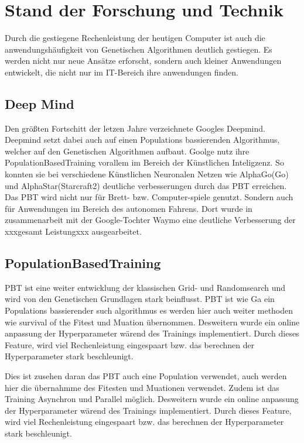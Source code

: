 \section{Stand der Forschung und Technik}
Durch die gestiegene Rechenleistung der heutigen Computer ist auch die anwendungshäufigkeit von Genetischen Algorithmen deutlich gestiegen. Es werden nicht nur neue Ansätze erforscht, sondern auch kleiner Anwendungen entwickelt, die nicht nur im IT-Bereich ihre anwendungen finden.

\subsection{Deep Mind}
Den größten Fortschitt der letzen Jahre verzeichnete Googles Deepmind. Deepmind setzt dabei auch auf einen Populations bassierenden Algorithmus, welcher auf den Genetischen Algorithmen aufbaut. Goolge nutz ihre PopulationBasedTraining vorallem im Bereich der Künstlichen Inteligzenz. So konnten sie bei verschiedene Künstlichen Neuronalen Netzen wie AlphaGo(Go)\cite{alphago} und AlphaStar(Starcraft2)\cite{alphastar} deutliche verbesserungen durch das PBT erreichen. Das PBT wird nicht nur für Brett- bzw. Computer-spiele genutzt. Sondern auch für Anwendungen im Bereich des autonomen Fahrens. Dort wurde in zusammenarbeit mit der Google-Tochter Waymo eine deutliche Verbesserung der xxxgesamt Leistungxxx ausgearbeitet. 

\subsection{PopulationBasedTraining}
PBT ist eine weiter entwicklung der klassischen Grid- und Randomsearch und wird von den Genetischen Grundlagen stark beinflusst. PBT ist wie Ga ein Populations bassierender such algorithmus es werden hier auch weiter methoden wie survival of the Fitest und Muation übernommen. Desweitern wurde ein online anpassung der Hyperparameter wärend des Trainings implementiert. Durch dieses Feature, wird viel Rechenleistung eingespaart bzw. das berechnen der Hyperparameter stark beschleunigt. \cite{pbt}

\iffalse
Dies ist zusehen daran das PBT auch eine Population verwendet, auch werden hier die übernahmme des Fitesten und Muationen verwendet. Zudem ist das Training Asynchron und Parallel möglich.
Desweitern wurde ein online anpassung der Hyperparameter wärend des Trainings implementiert. Durch dieses Feature, wird viel Rechenleistung eingespaart bzw. das berechnen der Hyperparameter stark beschleunigt. \cite{pbt}


